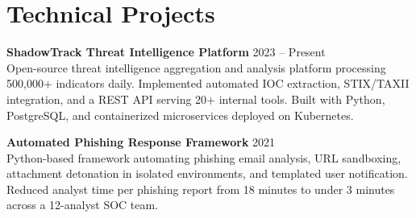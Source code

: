 \documentclass[11pt,a4paper]{article}
\newcommand{\cvdate}[1]{\textcolor{mediumgray}{\small #1}}
\begin{document}
\section{Technical Projects}

\vspace{4pt}

\noindent
\textbf{ShadowTrack Threat Intelligence Platform} \hfill \cvdate{2023 -- Present}\\
\small Open-source threat intelligence aggregation and analysis platform processing 500,000+ indicators daily. Implemented automated IOC extraction, STIX/TAXII integration, and a REST API serving 20+ internal tools. Built with Python, PostgreSQL, and containerized microservices deployed on Kubernetes.

\vspace{6pt}

\noindent
\textbf{Automated Phishing Response Framework} \hfill \cvdate{2021}\\
\small Python-based framework automating phishing email analysis, URL sandboxing, attachment detonation in isolated environments, and templated user notification. Reduced analyst time per phishing report from 18 minutes to under 3 minutes across a 12-analyst SOC team.
\end{document}
